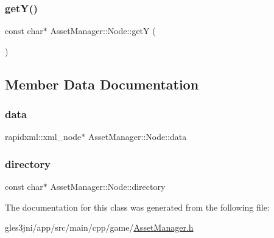 \mbox{\label{class_asset_manager_1_1_node_a4661b08edcf7addf271c9339a3631a96}} 
\subsubsection{\texorpdfstring{get\+Y()}{getY()}}
{\footnotesize\ttfamily const char$\ast$ Asset\+Manager\+::\+Node\+::getY (\begin{DoxyParamCaption}{ }\end{DoxyParamCaption})\hspace{0.3cm}{\ttfamily [inline]}}



\subsection{Member Data Documentation}
\mbox{\label{class_asset_manager_1_1_node_addfff47185d0626ec038163a7412fb5f}} 
\subsubsection{\texorpdfstring{data}{data}}
{\footnotesize\ttfamily rapidxml\+::xml\+\_\+node$\ast$ Asset\+Manager\+::\+Node\+::data\hspace{0.3cm}{\ttfamily [private]}}

\mbox{\label{class_asset_manager_1_1_node_a26aef3543a3e17b4412ab227fca00ad6}} 
\subsubsection{\texorpdfstring{directory}{directory}}
{\footnotesize\ttfamily const char$\ast$ Asset\+Manager\+::\+Node\+::directory\hspace{0.3cm}{\ttfamily [private]}}



The documentation for this class was generated from the following file\+:\begin{DoxyCompactItemize}
\item 
gles3jni/app/src/main/cpp/game/\hyperlink{_asset_manager_8h}{Asset\+Manager.\+h}\end{DoxyCompactItemize}
